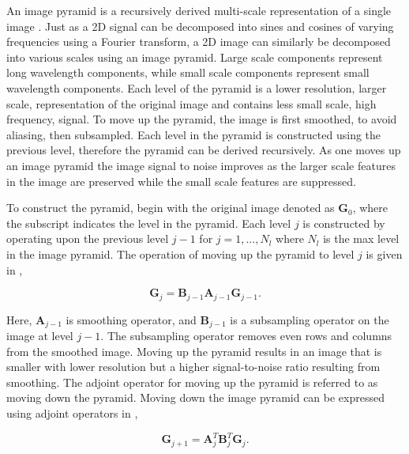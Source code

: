 
An image pyramid is a recursively derived multi-scale representation of a single image \cite[]{gonzalez2009digital}.  Just as a 2D signal can be decomposed into sines and cosines of varying frequencies using a Fourier transform, a 2D image can similarly be decomposed into various scales using an image pyramid.  Large scale components represent long wavelength components, while small scale components represent small wavelength components.  Each level of the pyramid is a lower resolution, larger scale, representation of the original image and contains less small scale, high frequency, signal.  To move up the pyramid, the image is first smoothed, to avoid aliasing, then subsampled.  Each level in the pyramid is constructed using the previous level, therefore the pyramid can be derived recursively.  As one moves up an image pyramid the image signal to noise improves as the larger scale features in the image are preserved while the small scale features are suppressed. 

To construct the pyramid, begin with the original image denoted as $\mathbf{G}_{0}$, where the subscript indicates the level in the pyramid.  Each level $j$ is constructed by operating upon the previous level $j-1$ for $j=1, \hdots , N_l$ where $N_l$ is the max level in the image pyramid.  The operation of moving up the pyramid to level $j$ is given in ,

\begin{equation} \label{eqn:pyrup}
\mathbf{G}_j=\mathbf{B}_{j-1}\mathbf{A}_{j-1}\mathbf{G}_{j-1}.
\end{equation}

Here, $\mathbf{A}_{j-1}$ is smoothing operator, and $\mathbf{B}_{j-1}$ is a subsampling operator on the image at level $j-1$.  The subsampling operator removes even rows and columns from the smoothed image.  Moving up the pyramid results in an image that is smaller with lower resolution but a higher signal-to-noise ratio resulting from smoothing.  The adjoint operator for moving up the pyramid is referred to as moving down the pyramid.  Moving down the image pyramid can be expressed using adjoint operators in ,

\begin{equation} \label{eqn:pyrdown} 
\mathbf{G}_{j+1}=\mathbf{A}^T_{j}\mathbf{B}^T_{j}\mathbf{G}_{j}.
\end{equation}

